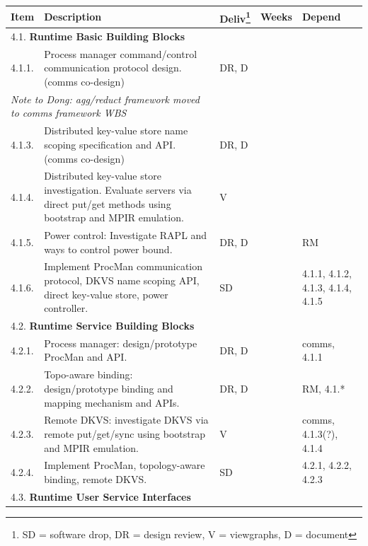 \begin{longtable}{|p{1cm}|p{10.2cm}|p{1cm}|p{1cm}|p{1.8cm}|}\hline
  \textbf{Item} & \textbf{Description}
                & \textbf{Deliv}\footnote{SD = software drop,
                        DR = design review, V = viewgraphs, D = document}
                & \textbf{Weeks} & \textbf{Depend} \\
  \hline
  \hline
  \multicolumn{5}{|l|}{4.1. \textbf{Runtime Basic Building Blocks}} \\
  \hline
  4.1.1.& Process manager command/control communication protocol design.
          (comms co-design)
        & DR, D
        & 
        & \\
  \hline
  \multicolumn{2}{|l|}{\em Note to Dong: agg/reduct framework moved to comms
              framework WBS}
        &
        &
        & \\
  \hline
  4.1.3.& Distributed key-value store name scoping specification and API.
          (comms co-design)
        & DR, D
        & 
        & \\
  \hline
  4.1.4.& Distributed key-value store investigation.  Evaluate servers
          via direct put/get methods using bootstrap and MPIR emulation.
        & V
        & 
        & \\
  \hline
  4.1.5.& Power control: Investigate  RAPL and ways to control power bound.
        & DR, D
        & 
        & RM \\
  \hline
  4.1.6.& Implement ProcMan communication protocol, DKVS name scoping API,
          direct key-value store, power controller.
        & SD
        & 
        & 4.1.1, 4.1.2, 4.1.3, 4.1.4, 4.1.5 \\
  \hline
  \multicolumn{5}{|l|}{4.2. \textbf{Runtime Service Building Blocks}} \\
  \hline
  4.2.1.& Process manager: design/prototype ProcMan and API.
        & DR, D
        & 
        & comms, 4.1.1\\
  \hline
  4.2.2.& Topo-aware binding: design/prototype binding and mapping
          mechanism and APIs.
        & DR, D
        & 
        & RM, 4.1.*\\
  \hline
  4.2.3.& Remote DKVS: investigate DKVS via remote put/get/sync using
	  bootstrap and MPIR emulation.
        & V
        & 
        & comms, 4.1.3(?), 4.1.4\\
  \hline
  4.2.4.& Implement ProcMan, topology-aware binding, remote DKVS.
        & SD 
        & 
        & 4.2.1, 4.2.2, 4.2.3 \\
  \hline
  \multicolumn{5}{|l|}{4.3. \textbf{Runtime User Service Interfaces}} \\

\end{longtable}
